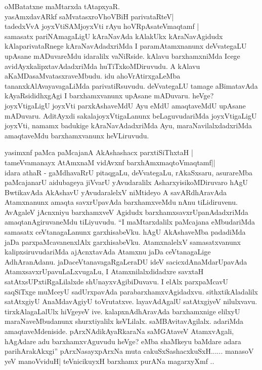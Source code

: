 \begin{artha}
oMBatatxne maMtarxda tAtapxyaR.\\
yasAmxdavARkf saMvatasxroV\s hoVBiH parivataRteV|\\
tadedxVvA joyxVtiSAMjoyxVti rAyu hoVRpAsateV\s maqtamf |\\
samasatx pariNAmagaLigU kAraNavAda kAlakUkx kAraNavAgidudx kAlaparivataRnege kAraNavAdadxriMda I paramAtamxnanunx deVvategaLU upAsane mADuvareMdu idaralilx vaNiRside. kAlavu barxhamxniMda Icege avidAyxkalipxtavAdadxriMda huTiTxkoMDiruvudu. A kAlavu aKaMDasaMvatasxraveMbudu. idu ahoVrAtirxgaLeMba tananx\break kAlAvayavagaLiMda parivatiRsuvudu. deVvategaLU tamage aBimatavAda kAyaRsididhxgAgi I barxhamxvanunx upAsane mADuvaru. heVge? joyxVtigaLigU joyxVti parxkAshaveMdU Ayu eMdU amaqtaveMdU upAsane mADuvaru. AditAyxdi sakalajoyxVtigaLanunx beLaguvudariMda joyxVtigaLigU joyxVti, namamx badukige kAraNavAdadxriMda Ayu, maraNavilalxdadxriMda amaqtaveMdu barxhamxvanunx heVLiruvudu.
\end{artha}


\begin{artha}
yasimxnf paMca paMcajanA AkAshashacx parxtiSiThxtaH |\\
tameVvamanayx AtAmxnaM vidAvxnf barxhAmxmaqtoV\s maqtamf||\\
idara athaR - gaMdhavaRrU pitaqgaLu, deVvategaLu, rAkaSxsaru, asurareMba paMcajanarU aidubageya jiVvarU yAvudaralilx AsharxyisikoMDiruvaro hAgU BwtikavAda AkAshavU yAvudaralelxV niMtideyo A savARdhAravAda Atamxnanunx amaqta savxrUpavAda barxhamxveMdu nAnu tiLidiruvenu. AvAgaleV jAcnxniyu barxhamxveV Agidudx barxhamxsavxrUpanAdadxriMda amaqtanAgiruvaneMdu tiLiyuvudu. ``I maMtarxdalilx paMcajana eMbudariMda samasatx ceVtanagaLanunx garxhisabeVku. hAgU AkAshaveMba padadiMda jaDa parxpaMcavanenxlAlx garxhisabeVku. AtamxnalelxV samasatxvanunx kalipxsiruvudariMda ajAcnxtavAda Atamxnu jaDa ceVtanagaLige AdhAranAdanu. jaDaceVtanavagaRgaLeraDU ideV sacicxdAnaMdarUpavAda AtamxsavxrUpavuLaLxvugaLu, I Atamxnilalxdidadxre savxtaH satAtxsUPxtiRgaLilalxde shUnayxvAgibiDuvavu. I elAlx parxpaMcavU saqSiTxge muMceyU sadUrxpavAda parabarxhamxvAgidadxvu. sithxtikAladalilx satAtxgiyU AnaMdavAgiyU toVrutatxve. layavAdAgalU satAtxgiyeV nilulxvavu. tirxkAlagaLalUlx hiVgeyeV ive. kalapxnAdhAravAda barxhamxnige elilxyU maraNaveMbudanunx shurxtiyalilx keVLilalx. saMBAvitavAgilalx. adariMda amaqtaveMdeniside. pArxNAdikAyaRkaraNa saMGAtaveV AtamxvAgali, hAgAdare adu barxhamxvAguvudu heVge? eMba shaMkeyu baMdare adara parihArakAkxgi''
pArxNasayxpArxNa muta cakuSxSashacxkuSxH...... manasoV yeV manoVviduH| teVnicikuyxH barxhamx purANa magarxyXmf ..
\end{artha}

